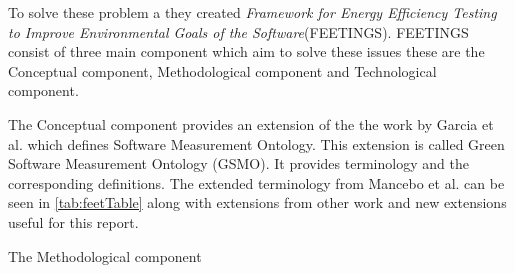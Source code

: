 To solve these problem a they created \textit{Framework for Energy Efficiency Testing to Improve Environmental Goals of the Software}(FEETINGS). FEETINGS consist of three main component which aim to solve these issues these are the Conceptual component, Methodological component and Technological component.\nytafsnit

The Conceptual component provides an extension of the the work by Garcia et al. which defines Software Measurement Ontology\cite{GARCIA2006631}. This extension is called Green Software Measurement Ontology (GSMO). It provides terminology and the corresponding definitions. The extended terminology from Mancebo et al. can be seen in \cref{tab:feetTable} along with extensions from other work and new extensions useful for this report.



The Methodological component 



